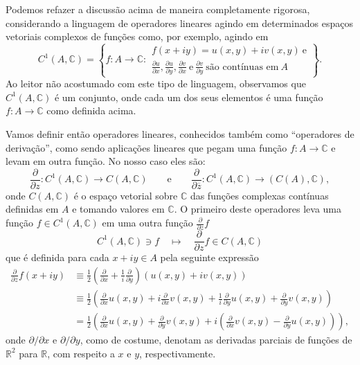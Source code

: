 Podemos refazer a discussão acima de maneira completamente rigorosa, considerando a linguagem de 
operadores lineares agindo em determinados espaços vetoriais complexos 
de funções como, por exemplo, agindo em  
\[
C^1(A,\mathbb{C}) 
=
\left\{ 
	f:A\to\mathbb{C}:
		\begin{array}{c}
		f(x+iy)= u(x,y)+iv(x,y) 
		\ \text{e}
		\\[0.2cm]
		\displaystyle\frac{\partial u}{\partial x}, \frac{\partial u}{\partial y} , \frac{\partial v}{\partial x} \ \text{e} \ 
		\frac{\partial v}{\partial y} \ \text{são contínuas em}\ A
		\end{array}
\right\}.  
\]
Ao leitor não acostumado com este tipo de linguagem, observamos que $C^1(A,\mathbb{C}) $ 
é um conjunto, onde cada um dos seus elementos é uma função $f:A\to\mathbb{C}$
como definida acima.

Vamos definir então operadores lineares, conhecidos também como ``operadores de derivação'',
como sendo aplicações lineares que pegam uma função $f:A\to\mathbb{C}$ e levam em outra 
função. No nosso caso eles são:
\[
\frac{\partial }{\partial z}: C^1(A,\mathbb{C}) \to C(A,\mathbb{C})
\qquad\text{e}\qquad 
\frac{\partial }{\partial \overline{z}}: C^1(A,\mathbb{C}) \to (C(A),\mathbb{C}),
\]
onde $C(A,\mathbb{C})$ é o espaço vetorial sobre $\mathbb{C}$ das funções complexas 
contínuas definidas em $A$ e tomando valores em  $\mathbb{C}$. 
O primeiro deste operadores leva uma função $f\in C^1(A,\mathbb{C})$ 
em uma outra função $\frac{\partial}{\partial z}f$
\[
C^1(A,\mathbb{C}) \ni f\quad \longmapsto\quad \frac{\partial}{\partial z}f \in C(A,\mathbb{C})
\]
que é definida para cada $x+iy\in A$ pela seguinte expressão 
\begin{align*}
\frac{\partial}{\partial z}f(x+iy) 
&\equiv
\frac{1}{2}
\left( 
\frac{\partial}{\partial x} +\frac{1}{i}\frac{\partial  }{\partial y}\right)(u(x,y)+iv(x,y)) 
\\
&\equiv 
\frac{1}{2}
	\left( 
		\frac{\partial}{\partial x}u(x,y)
		+i\frac{\partial}{\partial x}v(x,y) 
		+\frac{1}{i}\frac{\partial  }{\partial y}u(x,y) 
		+\frac{\partial  }{\partial y}v(x,y) 
	\right) 
\\
&=
\frac{1}{2}
\left( 
\frac{\partial}{\partial x}u(x,y) +\frac{\partial  }{\partial y}v(x,y) 
+i
	\left( 
		\frac{\partial}{\partial x}v(x,y) 
		-\frac{\partial  }{\partial y}u(x,y) 
	\right)
\right),
\end{align*}
onde $\partial/\partial x$ e $\partial/\partial y$, como de costume, denotam as derivadas parciais
de funções de $\mathbb{R}^2$ para $\mathbb{R}$,
com respeito a $x$ e $y$, respectivamente. 

